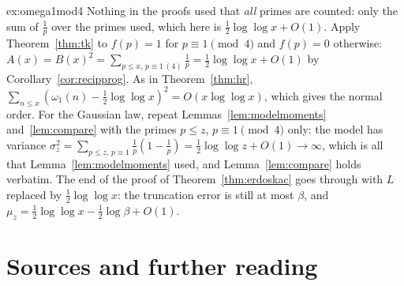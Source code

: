 \begin{solution}{ex:omega1mod4}
\idea Nothing in the proofs used that \emph{all} primes are counted: only the sum of $\frac1p$ over the primes used, which here is $\frac12\log\log x+O(1)$.
\writeup Apply Theorem~\ref{thm:tk} to $f(p)=1$ for $p\equiv1\pmod4$ and $f(p)=0$ otherwise: $A(x)=B(x)^2=\sum_{p\le x,\,p\equiv1\,(4)}\frac1p=\frac12\log\log x+O(1)$ by Corollary~\ref{cor:recipprog}. As in Theorem~\ref{thm:hr},
$\sum_{n\le x}(\omega_1(n)-\frac12\log\log x)^2=O(x\log\log x)$, which gives the normal order. For the Gaussian law, repeat Lemmas~\ref{lem:modelmoments} and~\ref{lem:compare} with the primes $p\le z$, $p\equiv1\pmod4$ only:
the model has variance $\sigma_z^2=\sum_{p\le z,\,p\equiv1}\frac1p(1-\frac1p)=\frac12\log\log z+O(1)\to\infty$, which is all that Lemma~\ref{lem:modelmoments} used, and Lemma~\ref{lem:compare} holds verbatim. The end of the proof of
Theorem~\ref{thm:erdoskac} goes through with $L$ replaced by $\frac12\log\log x$: the truncation error is still at most $\beta$, and $\mu_z=\frac12\log\log x-\frac12\log\beta+O(1)$.
\end{solution}

\section*{Sources and further reading}

